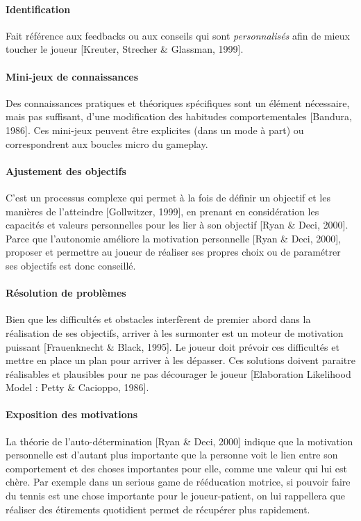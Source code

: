 			\paragraph{Identification \\ \quad}
Fait référence aux feedbacks ou aux conseils qui sont \emph{personnalisés} afin de mieux toucher le joueur [Kreuter, Strecher \& Glassman, 1999]. 
			\paragraph{Mini-jeux de connaissances \\ \quad}
Des connaissances pratiques et théoriques spécifiques sont un élément nécessaire, mais pas suffisant, d’une modification des habitudes comportementales [Bandura, 1986]. Ces mini-jeux peuvent être explicites (dans un mode à part) ou correspondrent aux boucles micro du gameplay.
			\paragraph{Ajustement des objectifs \\ \quad}
C’est un processus complexe qui permet à la fois de définir un objectif et les manières de l’atteindre [Gollwitzer, 1999], en prenant en considération les capacités et valeurs personnelles pour les lier à son objectif [Ryan \& Deci, 2000]. Parce que l’autonomie améliore la motivation personnelle [Ryan \& Deci, 2000], proposer et permettre au joueur de réaliser ses propres choix ou de paramétrer ses objectifs est donc conseillé.
			\paragraph{Résolution de problèmes \\ \quad}
Bien que les difficultés et obstacles interfèrent de premier abord dans la réalisation de ses objectifs, arriver à les surmonter est un moteur de motivation puissant [Frauenknecht \& Black, 1995]. Le joueur doit prévoir ces difficultés et mettre en place un plan pour arriver à les dépasser. Ces solutions doivent paraitre réalisables et plausibles pour ne pas décourager le joueur [Elaboration Likelihood Model : Petty \& Cacioppo, 1986].
			\paragraph{Exposition des motivations \\ \quad}
La théorie de l’auto-détermination [Ryan \& Deci, 2000] indique que la motivation personnelle est d’autant plus importante que la personne voit le lien entre son comportement et des choses importantes pour elle, comme une valeur qui lui est chère. Par exemple dans un serious game de rééducation motrice, si pouvoir faire du tennis est une chose importante pour le joueur-patient, on lui rappellera que réaliser des étirements quotidient permet de récupérer plus rapidement.

